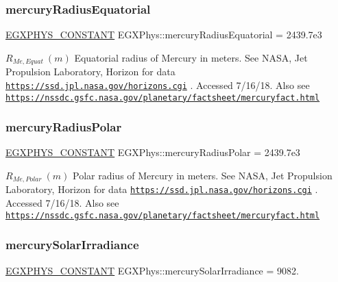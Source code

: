 \subsubsection{\texorpdfstring{mercury\+Radius\+Equatorial}{mercuryRadiusEquatorial}}
{\footnotesize\ttfamily \mbox{\hyperlink{group___e_g_x_phys-_constants-_macros_ga76980d288494ce1714c9ac68a95ba702}{E\+G\+X\+P\+H\+Y\+S\+\_\+\+C\+O\+N\+S\+T\+A\+NT}} E\+G\+X\+Phys\+::mercury\+Radius\+Equatorial = 2439.\+7e3}

$R_{Me,Equat} \ (m)$ Equatorial radius of Mercury in meters. See N\+A\+SA, Jet Propulsion Laboratory, Horizon for data \href{https://ssd.jpl.nasa.gov/horizons.cgi}{\tt https\+://ssd.\+jpl.\+nasa.\+gov/horizons.\+cgi} . Accessed 7/16/18. Also see \href{https://nssdc.gsfc.nasa.gov/planetary/factsheet/mercuryfact.html}{\tt https\+://nssdc.\+gsfc.\+nasa.\+gov/planetary/factsheet/mercuryfact.\+html} \mbox{\label{group___e_g_x_phys-_constants-_astrophysics-_solar_system-_mercury-_bulk_ga09f4dddb4a5d0f0e539d5fcddfb5b45c}} 
\subsubsection{\texorpdfstring{mercury\+Radius\+Polar}{mercuryRadiusPolar}}
{\footnotesize\ttfamily \mbox{\hyperlink{group___e_g_x_phys-_constants-_macros_ga76980d288494ce1714c9ac68a95ba702}{E\+G\+X\+P\+H\+Y\+S\+\_\+\+C\+O\+N\+S\+T\+A\+NT}} E\+G\+X\+Phys\+::mercury\+Radius\+Polar = 2439.\+7e3}

$R_{Me,Polar} \ (m)$ Polar radius of Mercury in meters. See N\+A\+SA, Jet Propulsion Laboratory, Horizon for data \href{https://ssd.jpl.nasa.gov/horizons.cgi}{\tt https\+://ssd.\+jpl.\+nasa.\+gov/horizons.\+cgi} . Accessed 7/16/18. Also see \href{https://nssdc.gsfc.nasa.gov/planetary/factsheet/mercuryfact.html}{\tt https\+://nssdc.\+gsfc.\+nasa.\+gov/planetary/factsheet/mercuryfact.\+html} \mbox{\label{group___e_g_x_phys-_constants-_astrophysics-_solar_system-_mercury-_bulk_ga36990b1744cb8a5cfaaf68771dde41fd}} 
\subsubsection{\texorpdfstring{mercury\+Solar\+Irradiance}{mercurySolarIrradiance}}
{\footnotesize\ttfamily \mbox{\hyperlink{group___e_g_x_phys-_constants-_macros_ga76980d288494ce1714c9ac68a95ba702}{E\+G\+X\+P\+H\+Y\+S\+\_\+\+C\+O\+N\+S\+T\+A\+NT}} E\+G\+X\+Phys\+::mercury\+Solar\+Irradiance = 9082.}

